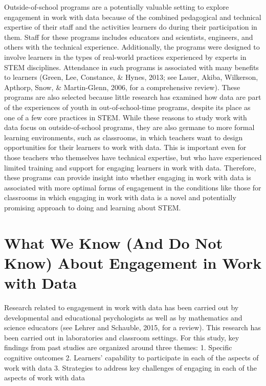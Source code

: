 \documentclass[]{book}
\theoremstyle{definition}
\theoremstyle{definition}
\theoremstyle{definition}
\theoremstyle{remark}
\begin{document}
Outside-of-school programs are a potentially valuable setting to explore
engagement in work with data because of the combined pedagogical and
technical expertise of their staff and the activities learners do during
their participation in them. Staff for these programs includes educators
and scientists, engineers, and others with the technical experience.
Additionally, the programs were designed to involve learners in the
types of real-world practices experienced by experts in STEM
disciplines. Attendance in such programs is associated with many
benefits to learners (Green, Lee, Constance, \& Hynes, 2013; see Lauer,
Akiba, Wilkerson, Apthorp, Snow, \& Martin-Glenn, 2006, for a
comprehensive review). These programs are also selected because little
research has examined how data are part of the experiences of youth in
out-of-school-time programs, despite its place as one of a few core
practices in STEM. While these reasons to study work with data focus on
outside-of-school programs, they are also germane to more formal
learning environments, such as classrooms, in which teachers want to
design opportunities for their learners to work with data. This is
important even for those teachers who themselves have technical
expertise, but who have experienced limited training and support for
engaging learners in work with data. Therefore, these programs can
provide insight into whether engaging in work with data is associated
with more optimal forms of engagement in the conditions like those for
classrooms in which engaging in work with data is a novel and
potentially promising approach to doing and learning about STEM.

\section{What We Know (And Do Not Know) About Engagement in Work with
Data}\label{what-we-know-and-do-not-know-about-engagement-in-work-with-data}

Research related to engagement in work with data has been carried out by
developmental and educational psychologists as well as by mathematics
and science educators (see Lehrer and Schauble, 2015, for a review).
This research has been carried out in laboratories and classroom
settings. For this study, key findings from past studies are organized
around three themes: 1. Specific cognitive outcomes 2. Learners'
capability to participate in each of the aspects of work with data 3.
Strategies to address key challenges of engaging in each of the aspects
of work with data
\end{document}
